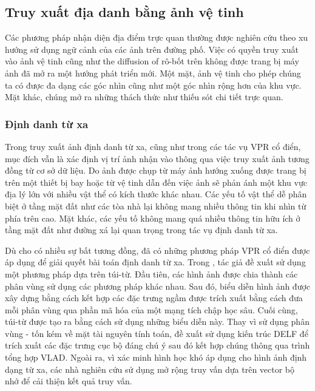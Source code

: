 \subsection{Truy xuất địa danh bằng ảnh vệ tinh}
Các phương pháp nhận diện địa điểm trực quan thường được nghiên cứu theo xu hướng sử dụng ngữ cảnh của các ảnh trên đường phố. Việc có quyền truy xuất vào ảnh vệ tinh cũng như the diffusion of rô-bốt trên không được trang bị máy ảnh đã mở ra một hướng phát triển mới. Một mặt, ảnh vệ tinh cho phép chúng ta có được đa dạng các góc nhìn cũng như một góc nhìn rộng hơn của khu vực. Mặt khác, chúng mở ra những thách thức như thiếu sót chi tiết trực quan.

\subsubsection{Định danh từ xa}
Trong truy xuất ảnh định danh từ xa, cũng như trong các tác vụ VPR cổ điển, mục đích vẫn là xác định vị trí ảnh nhận vào thông qua việc truy xuất ảnh tương đồng từ cơ sở dữ liệu. Do ảnh được chụp từ máy ảnh hướng xuống được trang bị trên một thiết bị bay hoặc từ vệ tinh dẫn đến việc ảnh sẽ phản ánh một khu vực địa lý lớn với nhiều vật thể có kích thước khác nhau. Các yếu tố vật thể dễ phân biệt ở tầng mặt đất như các tòa nhà lại không mang nhiều thông tin khi nhìn từ phía trên cao. Mặt khác, các yếu tố không mang quá nhiều thông tin hữu ích ở tầng mặt đất như đường xá lại quan trọng trong tác vụ định danh từ xa.

Dù cho có nhiều sự bất tương đồng, đã có những phương pháp VPR cổ điển được áp dụng để giải quyết bài toán định danh từ xa. Trong \cite{Tang2018UnsupervisedDF}, tác giả đề xuất sử dụng một phương pháp dựa trên túi-từ. Đầu tiên, các hình ảnh được chia thành các phân vùng sử dụng các phương pháp khác nhau. Sau đó, biểu diễn hình ảnh được xây dựng bằng cách kết hợp các đặc trưng ngầm được trích xuất bằng cách đưa mỗi phân vùng qua phần mã hóa của một mạng tích chập học sâu. Cuối cùng, túi-từ được tạo ra bằng cách sử dụng những biểu diễn này. Thay vì sử dụng phân vùng - tốn kém về mặt tài nguyên tính toán, \cite{Imbriaco_2019} đề xuất sử dụng kiến trúc DELF để trích xuất các đặc trưng cục bộ đáng chú ý sau đó kết hợp chúng thông qua trình tổng hợp VLAD. Ngoài ra, vì xác minh hình học khó áp dụng cho hình ảnh định dạng từ xa, các nhà nghiên cứu sử dụng mở rộng truy vấn dựa trên vector bộ nhớ \cite{7870636} để cải thiện kết quả truy vấn.

